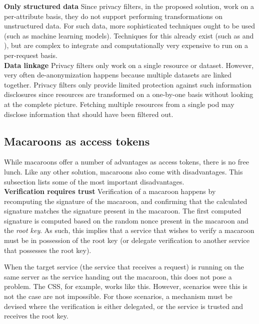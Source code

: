 \noindent \textbf{Only structured data} Since privacy filters, in the proposed solution, work on a per-attribute basis, they do not support performing transformations on unstructured data. For such data, more sophisticated techniques ought to be used (such as machine learning models). Techniques for this already exist (such as \citet{privacy-unstructured-scoring} and \citet{privacy-preserving-unstructured}), but are complex to integrate and computationally very expensive to run on a per-request basis. \\

\noindent \textbf{Data linkage} Privacy filters only work on a single resource or dataset. However, very often de-anonymization happens because multiple datasets are linked together. Privacy filters only provide limited protection against such information disclosures since resources are transformed on a one-by-one basis without looking at the complete picture. Fetching multiple resources from a single pod may disclose information that should have been filtered out.

\subsection{Macaroons as access tokens}
While macaroons offer a number of advantages as access tokens, there is no free lunch. Like any other solution, macaroons also come with disadvantages. This subsection lists some of the most important disadvantages.\\

\noindent \textbf{Verification requires trust} Verification of a macaroon happens by recomputing the signature of the macaroon, and confirming that the calculated signature matches the signature present in the macaroon. The first computed signature is computed based on the random nonce present in the macaroon and the \textit{root key}. As such, this implies that a service that wishes to verify a macaroon must be in possession of the root key (or delegate verification to another service that possesses the root key). 

When the target service (the service that receives a request) is running on the same server as the service handing out the macaroon, this does not pose a problem. The \acrlong{CSS}, for example, works like this. However, scenarios were this is not the case are not impossible. For those scenarios, a mechanism must be devised where the verification is either delegated, or the service is trusted and receives the root key.\\

